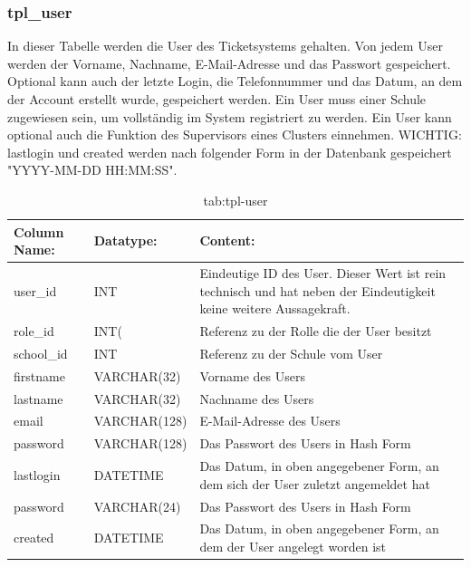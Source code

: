 \newpage

\subsubsection{tpl\_user}

In dieser Tabelle werden die User des Ticketsystems gehalten. Von jedem User werden der Vorname, Nachname, E-Mail-Adresse und das Passwort gespeichert. Optional kann auch der letzte Login, die Telefonnummer und das Datum, an dem der Account erstellt wurde, gespeichert werden.
Ein User muss einer Schule zugewiesen sein, um vollständig im System registriert zu werden. Ein User kann optional auch die Funktion des Supervisors eines Clusters einnehmen.
WICHTIG: lastlogin und created werden nach folgender Form in der Datenbank gespeichert "YYYY-MM-DD HH:MM:SS".

\begin{table}[h]
	\begin{tabular}{|p{3.5cm}|p{4cm}|p{6.2cm}|}
		\hline
		\textbf{Column Name:} & \textbf{Datatype:} & \textbf{Content:}\\
		\hline
		user\_id & INT & Eindeutige ID des User. Dieser Wert ist rein technisch und hat  neben der Eindeutigkeit keine weitere Aussagekraft.\\
		\hline
		role\_id & INT( & Referenz zu der Rolle die der User besitzt\\
		\hline
		school\_id & INT &  Referenz zu der Schule vom User \\
		\hline
		firstname & VARCHAR(32) & Vorname des Users\\
		\hline
		lastname & VARCHAR(32) & Nachname des Users\\
		\hline
		email & VARCHAR(128) & E-Mail-Adresse des Users\\
		\hline
		password & VARCHAR(128) & Das Passwort des Users in Hash Form \\
		\hline
		lastlogin & DATETIME & Das Datum, in oben angegebener Form, an dem sich der User zuletzt angemeldet hat \\
		\hline
		password & VARCHAR(24) & Das Passwort des Users in Hash Form \\
		\hline
		created & DATETIME & Das Datum, in oben angegebener Form, an dem der User angelegt worden ist\\
		\hline
	\end{tabular}
	\caption{tab:tpl-user}
\end{table}
\label{tab:tpl_user}

\newpage

